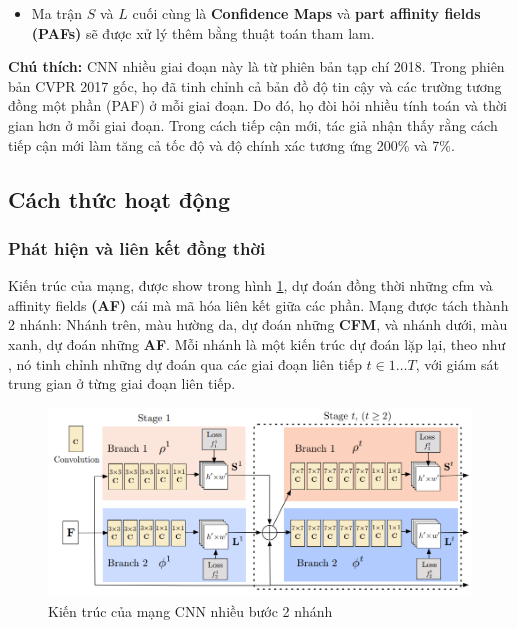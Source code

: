 \begin{itemize}
\begin{itemize}
\item Ma trận $S$ và $L$ cuối cùng là \textbf{Confidence Maps} và \textbf{part affinity fields (PAFs)} sẽ được xử lý thêm bằng thuật toán tham lam.

\end{itemize}
\end{itemize}
\textbf{Chú thích:}
CNN nhiều giai đoạn này là từ phiên bản tạp chí 2018. Trong phiên bản CVPR 2017 gốc, họ đã tinh chỉnh cả bản đồ độ tin cậy và các trường tương đồng một phần (PAF) ở mỗi giai đoạn. Do đó, họ đòi hỏi nhiều tính toán và thời gian hơn ở mỗi giai đoạn. Trong cách tiếp cận mới, tác giả nhận thấy rằng cách tiếp cận mới làm tăng cả tốc độ và độ chính xác tương ứng 200\% và 7\%.

\subsection{Cách thức hoạt động}
\label{sss:work}
\subsubsection{Phát hiện và liên kết đồng thời}

Kiến trúc của mạng, được show trong hình \ref{fig:structure}, dự đoán đồng thời những cfm và affinity fields \textbf{(AF)} cái mà mã hóa liên kết giữa các phần. Mạng được tách thành 2 nhánh: Nhánh trên, màu hường da, dự đoán những \textbf{CFM}, và nhánh dưới, màu xanh, dự đoán những \textbf{AF}. Mỗi nhánh là một kiến trúc dự đoán lặp lại, theo như \cite{wei2016convolutional}, nó tinh chỉnh những dự đoán qua các giai đoạn liên tiếp $t \in {{1 \ldots T}}$,  với giám sát trung gian ở từng giai đoạn liên tiếp.

\FloatBarrier
\begin{figure}[htp]
\begin{center}
\includegraphics[scale=0.45]{chap3/c3_figs/structure.png}
\end{center}
\caption{Kiến trúc của mạng CNN nhiều bước 2 nhánh}
\label{fig:structure}
\end{figure}
\FloatBarrier

